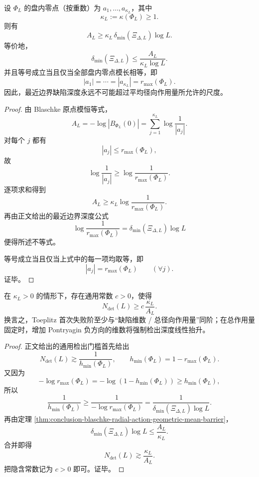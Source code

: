 \begin{theorem}\label{thm:conclusion-blaschke-radial-action-geometric-mean-barrier}
设 \(\Phi_L\) 的盘内零点（按重数）为 \(a_1,\dots,a_{\kappa_L}\)，其中
\[
\kappa_L:=\kappa(\Phi_L)\ge 1.
\]
则有
\[
A_L
\ge
\kappa_L\,\delta_{\min}(\Xi_{\Delta,L})\log L.
\]
等价地，
\[
\delta_{\min}(\Xi_{\Delta,L})
\le
\frac{A_L}{\kappa_L\log L}.
\]
并且等号成立当且仅当全部盘内零点模长相等，即
\[
|a_1|=\cdots=|a_{\kappa_L}|=r_{\max}(\Phi_L).
\]
因此，最近边界缺陷深度永远不可能超过平均径向作用量所允许的尺度。
\end{theorem}
\begin{proof}
由 Blaschke 原点模恒等式，
\[
A_L=-\log|B_{\Phi_L}(0)|=\sum_{j=1}^{\kappa_L}\log\frac{1}{|a_j|}.
\]
对每个 \(j\) 都有
\[
|a_j|\le r_{\max}(\Phi_L),
\]
故
\[
\log\frac{1}{|a_j|}
\ge
\log\frac{1}{r_{\max}(\Phi_L)}.
\]
逐项求和得到
\[
A_L
\ge
\kappa_L\log\frac{1}{r_{\max}(\Phi_L)}.
\]
再由正文给出的最近边界深度公式
\[
\log\frac{1}{r_{\max}(\Phi_L)}
=
\delta_{\min}(\Xi_{\Delta,L})\log L
\]
便得所述不等式。

等号成立当且仅当上式中的每一项均取等，即
\[
|a_j|=r_{\max}(\Phi_L)
\qquad (\forall j).
\]
证毕。
\end{proof}

\begin{corollary}\label{cor:conclusion-toeplitz-detection-depth-lower-bound-radial-action}
在 \(\kappa_L>0\) 的情形下，存在通用常数 \(c>0\)，使得
\[
N_{\det}(L)\ge c\,\frac{\kappa_L}{A_L}.
\]
换言之，Toeplitz 首次失败阶至少与“缺陷维数 / 总径向作用量”同阶；在总作用量固定时，增加 Pontryagin 负方向的维数将强制检出深度线性抬升。
\end{corollary}
\begin{proof}
正文给出的通用检出门槛首先给出
\[
N_{\det}(L)\gtrsim \frac{1}{h_{\min}(\Phi_L)},
\qquad
h_{\min}(\Phi_L)=1-r_{\max}(\Phi_L).
\]
又因为
\[
-\log r_{\max}(\Phi_L)=-\log(1-h_{\min}(\Phi_L))\ge h_{\min}(\Phi_L),
\]
所以
\[
\frac{1}{h_{\min}(\Phi_L)}
\ge
\frac{1}{-\log r_{\max}(\Phi_L)}
=
\frac{1}{\delta_{\min}(\Xi_{\Delta,L})\log L}.
\]
再由定理 \ref{thm:conclusion-blaschke-radial-action-geometric-mean-barrier}，
\[
\delta_{\min}(\Xi_{\Delta,L})\log L
\le
\frac{A_L}{\kappa_L}.
\]
合并即得
\[
N_{\det}(L)\gtrsim \frac{\kappa_L}{A_L}.
\]
把隐含常数记为 \(c>0\) 即可。证毕。
\end{proof}

